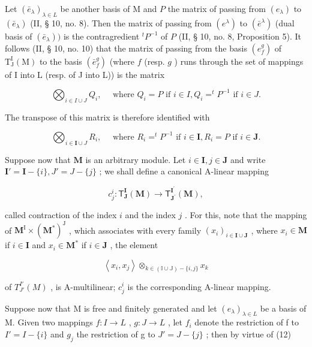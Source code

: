 Let \((\bar{e}_{\lambda})_{\lambda \in L}\) be another basis of M and \(P\) the matrix of passing from \((e_{\lambda})\) to \((\bar{e}_{\lambda})\) (II, § 10, no. 8). Then the matrix of passing from \((e^{\lambda})\) to \((\bar{e}^{\lambda})\) (dual basis of \((\bar{e}_{\lambda}))\) is the contragredient \(^{t}P^{-1}\) of \(P\) (II, § 10, no. 8, Proposition 5). It follows (II, § 10, no. 10) that the matrix of passing from the basis \((e_{f}^{g})\) of \(\mathrm{T}_{\mathrm{J}}^{\mathrm{I}}(\mathrm{M})\) to the basis \((\bar{e}_{f}^{g})\) (where \(f\) (resp. \(g\) ) runs through the set of mappings of I into L (resp. of J into L)) is the matrix

\[
\bigotimes_ {i \in I \cup J} Q _ {i}, \quad \text { where } Q _ {i} = P \text { if } i \in I, Q _ {i} = ^ {t} P ^ {- 1} \text { if } i \in J.\tag{13}
\]

The transpose of this matrix is therefore identified with

\[
\bigotimes_ {i \in \mathbf {I} \cup J} R _ {i}, \quad \text { where } R _ {i} = ^ {t} P ^ {- 1} \text { if } i \in \mathbf {I}, R _ {i} = P \text { if } i \in \mathbf {J}.\tag{14}
\]

Suppose now that \(\mathbf{M}\) is an arbitrary module. Let \(i\in \mathbf{I}, j\in \mathbf{J}\) and write \(\mathbf{I}' = \mathbf{I} - \{i\}, J' = J - \{j\}\) ; we shall define a canonical A-linear mapping

\[
c _ {j} ^ {i} \colon \mathsf {T} _ {\mathbf {J}} ^ {\mathbf {I}} (\mathbf {M}) \to \mathsf {T} _ {\mathbf {J} ^ {\prime}} ^ {\mathbf {I} ^ {\prime}} (\mathbf {M}),
\]

called contraction of the index \(i\) and the index \(j\) . For this, note that the mapping of \(\mathbf{M}^{\mathrm{I}} \times (\mathbf{M}^{*})^{\mathrm{J}}\) , which associates with every family \((x_{i})_{i \in \mathbf{I} \cup \mathbf{J}}\) , where \(x_{i} \in \mathbf{M}\) if \(i \in \mathbf{I}\) and \(x_{i} \in \mathbf{M}^{*}\) if \(i \in \mathbf{J}\) , the element

\[
\left\langle x _ {i}, x _ {j} \right\rangle \otimes_ {k \in (\mathbb {I} \cup \mathbb {J}) - \{i, j \}} x _ {k}\tag{15}
\]

of \(T_{J'}^{I'}(M)\) , is A-multilinear; \(c_{j}^{i}\) is the corresponding A-linear mapping.

Suppose now that M is free and finitely generated and let \((e_{\lambda})_{\lambda \in L}\) be a basis of M. Given two mappings \(f: I \to L\) , \(g: J \to L\) , let \(f_i\) denote the restriction of f to \(I' = I - \{i\}\) and \(g_j\) the restriction of g to \(J' = J - \{j\}\) ; then by virtue of (12)

